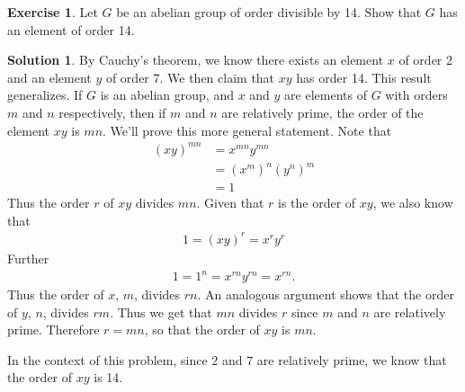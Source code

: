 \documentclass[12pt]{article}
\theoremstyle{definition}
\newtheorem{exercise}{\color{YellowOrange}Exercise}
\theoremstyle{definition}
\newtheorem{solution}{\color{Goldenrod}Solution}
\begin{document}
\begin{exercise}
	Let $G$ be an abelian group of order divisible by 14. Show that $G$ has an element of order 14.
\end{exercise}
\begin{solution}
	By Cauchy's theorem, we know there exists an element $x$ of order 2 and an element $y$ of order 7. We then claim that $xy$ has order 14. This result generalizes. If $G$ is an abelian group, and $x$ and $y$ are elements of $G$ with orders $m$ and $n$ respectively, then if $m$ and $n$ are relatively prime, the order of the element $xy$ is $mn$. We'll prove this more general statement. Note that
	\begin{align*}
	(xy)^{mn} &= x^{mn} y^{mn} \tag{since $G$ is abelian} \\ 
	&= (x^m)^n (y^n)^m \\
	&= 1
	\end{align*}
	Thus the order $r$ of $xy$ divides $mn$. Given that $r$ is the order of $xy$, we also know that 
	\begin{align*}
	1 = (xy)^r = x^r y^r \tag{since $G$ abelian}
	\end{align*}
	Further
	\begin{align*}
	1 = 1^n = x^{rn} y^{rn} = x^{rn} \tag{since $y^n = 1$}.
	\end{align*}
	Thus the order of $x$, $m$, divides $rn$. An analogous argument shows that the order of $y$, $n$, divides $rm$. Thus we get that $mn$ divides $r$ since $m$ and $n$ are relatively prime. Therefore $r = mn$, so that the order of $xy$ is $mn$. 

	In the context of this problem, since $2$ and $7$ are relatively prime, we know that the order of $xy$ is 14.
\end{solution}
\end{document}
